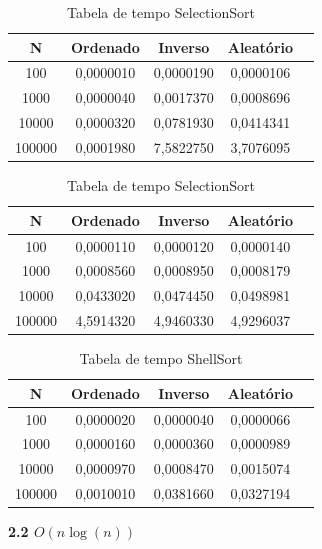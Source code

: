 \documentclass[10pt]{article}
\begin{document}
\begin{table}[H]
  \parbox{.45\linewidth}{
    \centering
    \caption{Tabela de tempo InsertionSort}
    \begin{tabular}{|c|c|c|c|c|}
    \hline
    N & Ordenado & Inverso & Aleatório \\ \hline
    100 & 0,0000010 & 0,0000190 & 0,0000106 \\ \hline
    1000 & 0,0000040 & 0,0017370 & 0,0008696 \\ \hline
    10000 & 0,0000320 & 0,0781930 & 0,0414341 \\ \hline
    100000 & 0,0001980 & 7,5822750 & 3,7076095 \\ \hline
    \end{tabular}
  }
  \hfill
  \parbox{.45\linewidth}{
    \centering
    \caption{Tabela de tempo SelectionSort}
    \begin{tabular}{|c|c|c|c|c|}
    \hline
    N & Ordenado & Inverso & Aleatório \\ \hline
    100 & 0,0000110 & 0,0000120 & 0,0000140 \\ \hline
    1000 & 0,0008560 & 0,0008950 & 0,0008179 \\ \hline
    10000 & 0,0433020 & 0,0474450 & 0,0498981 \\ \hline
    100000 & 4,5914320 & 4,9460330 & 4,9296037 \\ \hline
    \end{tabular}
  }
\end{table}

\begin{table}[H]
  \centering
  \caption{Tabela de tempo ShellSort}
  \begin{tabular}{|c|c|c|c|c|}
  \hline
  N & Ordenado & Inverso & Aleatório \\ \hline
  100 & 0,0000020 & 0,0000040 & 0,0000066 \\ \hline
  1000 & 0,0000160 & 0,0000360 & 0,0000989 \\ \hline
  10000 & 0,0000970 & 0,0008470 & 0,0015074 \\ \hline
  100000 & 0,0010010 & 0,0381660 & 0,0327194 \\ \hline
  \end{tabular}
\end{table}

\vspace{0.5cm}

\textbf{2.2 $O(n \log(n))$}
\end{document}
